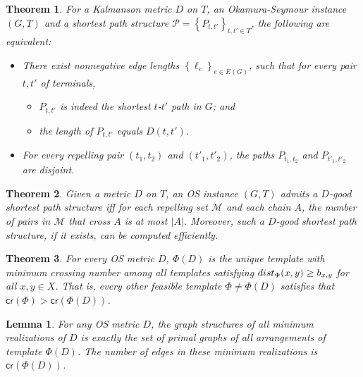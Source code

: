 \documentclass[10pt,a4paper]{amsart}
\newtheorem{theorem}{Theorem}
\newtheorem{lemma}{Lemma}
\newcommand{\cro}{{\mathsf{cr}}}
\newcommand{\dist}{\textnormal{dist}}
\newcommand{\mset}{{\mathcal M}}
\newcommand{\pset}{{\mathcal{P}}}
\newcommand{\set}[1]{\left\{ #1 \right\}}
\begin{document}
\begin{theorem}
\label{lem: 2-path condition}
For a Kalmanson metric $D$ on $T$, an Okamura-Seymour instance $(G,T)$ and a shortest path structure $\pset=\set{P_{t,t'}}_{t,t'\in T}$, the following are equivalent:
\begin{itemize}
    \item There exist nonnegative edge lengths $\set{\ell_e}_{e\in E(G)}$, such that
    for every pair $t,t'$ of terminals,
    \label{prop_2}
    \begin{itemize}
        \item $P_{t,t'}$ is indeed the shortest $t$-$t'$ path in $G$; and
        \item the length of $P_{t,t'}$ equals $D(t,t')$.
    \end{itemize}
    \item For every repelling pair $(t_1,t_2)$ and $(t'_1,t'_2)$, the paths $P_{t_1,t_2}$ and $P_{t'_1,t'_2}$ are disjoint.
\end{itemize}
\end{theorem}

\begin{theorem}
\label{thm:repelling-paths}
Given a metric $D$ on $T$, an OS instance $(G,T)$ admits a $D$-good shortest path structure iff for each repelling set $\mset$ and each chain $A$, the number of pairs in $\mset$ that cross $A$ is at most $|A|$. Moreover, such a $D$-good shortest path structure, if it exists, can be computed efficiently.
\end{theorem}

\begin{theorem}\label{thm:unique-template}
For every OS metric $D$, $\Phi(D)$ is the unique template with minimum crossing number among all templates satisfying $\dist_\Phi(x,y)\ge b_{x,y}$ for all $x,y\in X$.
That is, every other feasible template $\Phi\ne \Phi(D)$ satisfies that $\cro(\Phi)>\cro(\Phi(D))$.
\end{theorem}

\begin{lemma}\label{thm:minimum-realization}
For any OS metric $D$, the graph structures of all minimum realizations of $D$ is exactly the set of primal graphs of all arrangements of template $\Phi(D)$.
The number of edges in these minimum realizations is $\cro(\Phi(D))$.
\end{lemma}
\end{document}
